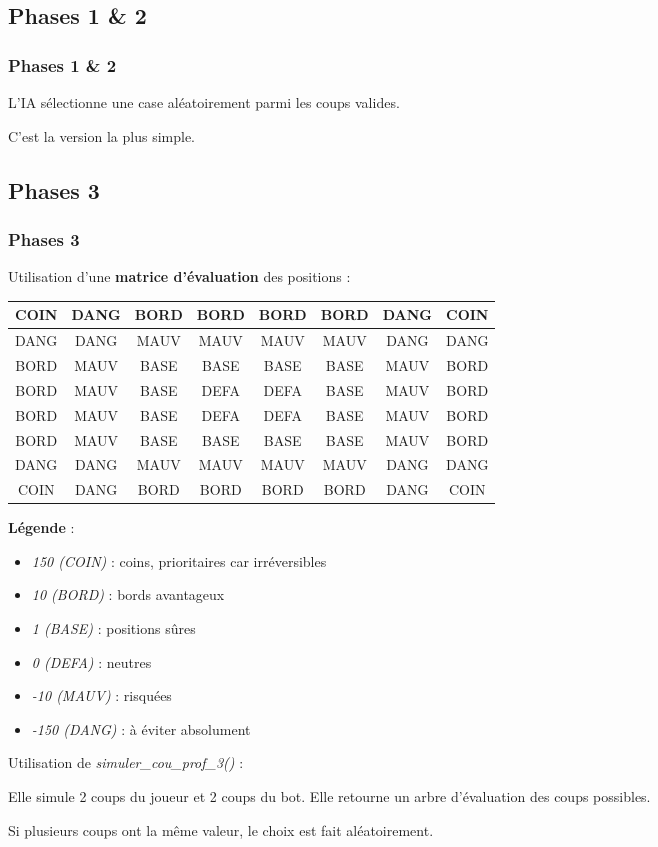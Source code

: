 \documentclass[9pt]{beamer}
\begin{document}
\subsection{Phases 1 \& 2}
\begin{frame}
  \frametitle{Phases 1 \& 2}
  L’IA sélectionne une case aléatoirement parmi les coups valides.

  C’est la version la plus simple.
\end{frame}

\subsection{Phases 3}
\begin{frame}
  \frametitle{Phases 3}
  Utilisation d’une \textbf{matrice d’évaluation} des positions :

  \begin{tabular}{|c|c|c|c|c|c|c|c|}
    \hline
    COIN & DANG & BORD & BORD & BORD & BORD & DANG & COIN \\
    \hline
    DANG & DANG & MAUV & MAUV & MAUV & MAUV & DANG & DANG \\
    \hline
    BORD & MAUV & BASE & BASE & BASE & BASE & MAUV & BORD \\
    \hline
    BORD & MAUV & BASE & DEFA & DEFA & BASE & MAUV & BORD \\
    \hline
    BORD & MAUV & BASE & DEFA & DEFA & BASE & MAUV & BORD \\
    \hline
    BORD & MAUV & BASE & BASE & BASE & BASE & MAUV & BORD \\
    \hline
    DANG & DANG & MAUV & MAUV & MAUV & MAUV & DANG & DANG \\
    \hline
    COIN & DANG & BORD & BORD & BORD & BORD & DANG & COIN \\
    \hline
  \end{tabular}
  \textbf{Légende} :
  \begin{itemize}
    \item \textit{150 (COIN)} : coins, prioritaires car irréversibles
    \item \textit{10 (BORD)} : bords avantageux
    \item \textit{1 (BASE)} : positions sûres
    \item \textit{0 (DEFA)} : neutres
    \item \textit{-10 (MAUV)} : risquées
    \item \textit{-150 (DANG)} : à éviter absolument
  \end{itemize}
  Utilisation de \textit{simuler\_cou\_prof\_3()} :

Elle simule 2 coups du joueur et 2 coups du bot. Elle retourne un arbre d’évaluation des coups possibles.

Si plusieurs coups ont la même valeur, le choix est fait aléatoirement.
\end{frame}
\end{document}
